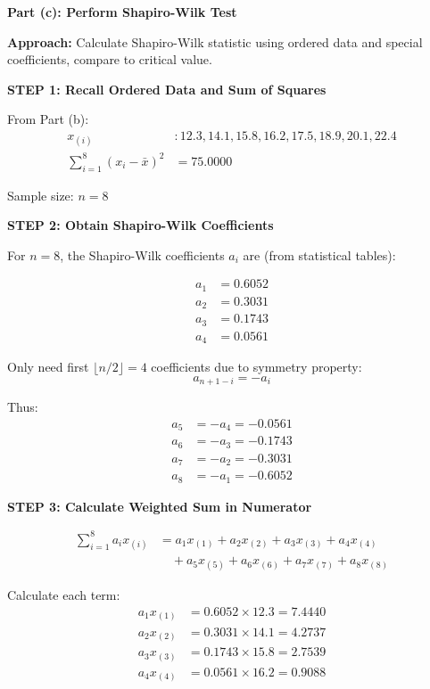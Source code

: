 \documentclass[12pt]{article}
\begin{document}
\begin{solution}

\textbf{Part (c): Perform Shapiro-Wilk Test}

\textbf{Approach:} Calculate Shapiro-Wilk statistic using ordered data and special coefficients, compare to critical value.

\textbf{STEP 1: Recall Ordered Data and Sum of Squares}

From Part (b):
\begin{align*}
x_{(i)} &: 12.3, 14.1, 15.8, 16.2, 17.5, 18.9, 20.1, 22.4 \\
\sum_{i=1}^{8} (x_i - \bar{x})^2 &= 75.0000
\end{align*}

Sample size: $n = 8$

\textbf{STEP 2: Obtain Shapiro-Wilk Coefficients}

For $n = 8$, the Shapiro-Wilk coefficients $a_i$ are (from statistical tables):

\begin{align*}
a_1 &= 0.6052 \\
a_2 &= 0.3031 \\
a_3 &= 0.1743 \\
a_4 &= 0.0561
\end{align*}

Only need first $\lfloor n/2 \rfloor = 4$ coefficients due to symmetry property:
\[a_{n+1-i} = -a_i\]

Thus:
\begin{align*}
a_5 &= -a_4 = -0.0561 \\
a_6 &= -a_3 = -0.1743 \\
a_7 &= -a_2 = -0.3031 \\
a_8 &= -a_1 = -0.6052
\end{align*}

\textbf{STEP 3: Calculate Weighted Sum in Numerator}

\begin{align*}
\sum_{i=1}^{8} a_i x_{(i)} &= a_1 x_{(1)} + a_2 x_{(2)} + a_3 x_{(3)} + a_4 x_{(4)} \\
&\quad + a_5 x_{(5)} + a_6 x_{(6)} + a_7 x_{(7)} + a_8 x_{(8)}
\end{align*}

Calculate each term:
\begin{align*}
a_1 x_{(1)} &= 0.6052 \times 12.3 = 7.4440 \\
a_2 x_{(2)} &= 0.3031 \times 14.1 = 4.2737 \\
a_3 x_{(3)} &= 0.1743 \times 15.8 = 2.7539 \\
a_4 x_{(4)} &= 0.0561 \times 16.2 = 0.9088
\end{align*}


\end{solution}
\end{document}
